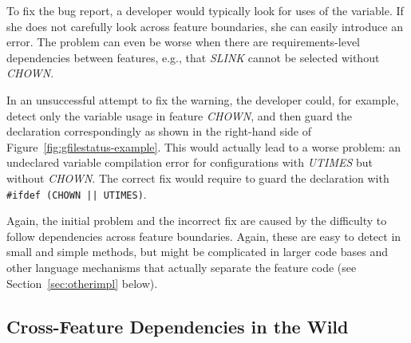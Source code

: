 To fix the bug report, a developer would typically look for uses of the variable. If she does not carefully look across feature boundaries, she can easily introduce an error. The problem can even be worse when there are requirements-level dependencies between features, e.g., that \emph{SLINK} cannot be selected without \emph{CHOWN}.

In an unsuccessful attempt to fix the warning, the developer could, for example,  detect only the variable usage in feature \emph{CHOWN}, and then guard the declaration correspondingly as shown in the right-hand side of Figure~\ref{fig:gfilestatus-example}. This would actually lead to a worse problem: an undeclared variable compilation error for configurations with \emph{UTIMES} but without \emph{CHOWN}. The correct fix would require to guard the declaration with \texttt{\#ifdef (CHOWN || UTIMES)}.


Again, the initial problem and the incorrect fix are caused by the difficulty to follow dependencies across feature boundaries. Again, these are easy to detect in small and simple methods, but might be complicated in larger code bases and other language mechanisms that actually separate the feature code (see Section~\ref{sec:otherimpl} below).



\subsection{Cross-Feature Dependencies in the Wild}

